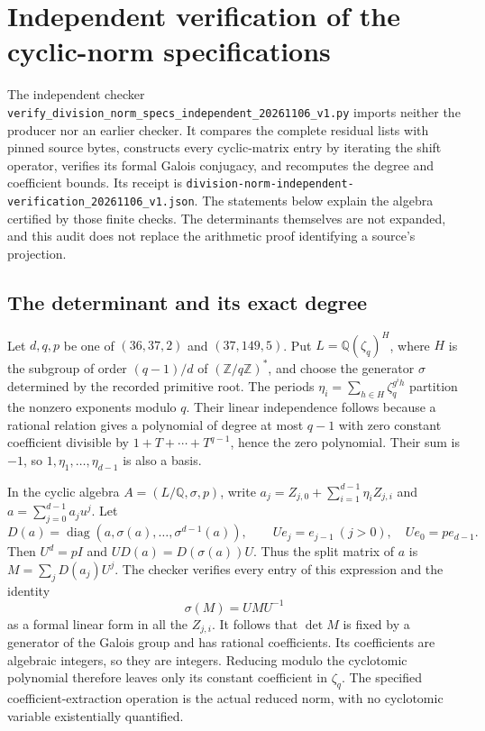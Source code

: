 \section{Independent verification of the cyclic-norm specifications}
\label{sec:independent-norm-audit-phase3}

The independent checker
\texttt{verify\_division\_norm\_specs\_independent\_20261106\_v1.py}
imports neither the producer nor an earlier checker.  It compares the
complete residual lists with pinned source bytes, constructs every
cyclic-matrix entry by iterating the shift operator, verifies its formal
Galois conjugacy, and recomputes the degree and coefficient bounds.
Its receipt is
\texttt{division-norm-independent-verification\_20261106\_v1.json}.
The statements below explain the algebra certified by those finite checks.
The determinants themselves are not expanded, and this audit does not
replace the arithmetic proof identifying a source's projection.

\subsection{The determinant and its exact degree}

Let $d,q,p$ be one of $(36,37,2)$ and $(37,149,5)$.  Put
$L=\mathbb Q(\zeta_q)^H$, where $H$ is the subgroup of order
$(q-1)/d$ of $(\mathbb Z/q\mathbb Z)^*$, and choose the generator
$\sigma$ determined by the recorded primitive root.  The periods
$\eta_i=\sum_{h\in H}\zeta_q^{g^ih}$ partition the nonzero
exponents modulo $q$.  Their linear independence follows because
a rational relation gives a polynomial of degree at most $q-1$
with zero constant coefficient divisible by
$1+T+\cdots+T^{q-1}$, hence the zero polynomial.  Their sum is
$-1$, so $1,\eta_1,\ldots,\eta_{d-1}$ is also a basis.

In the cyclic algebra $A=(L/\mathbb Q,\sigma,p)$, write
$a_j=Z_{j,0}+\sum_{i=1}^{d-1}\eta_iZ_{j,i}$ and
$a=\sum_{j=0}^{d-1}a_ju^j$.  Let
\[
 D(a)=\operatorname{diag}(a,\sigma(a),\ldots,\sigma^{d-1}(a)),
 \qquad Ue_j=e_{j-1}\ (j>0),\quad Ue_0=pe_{d-1}.
\]
Then $U^d=pI$ and $UD(a)=D(\sigma(a))U$.  Thus the split
matrix of $a$ is $M=\sum_jD(a_j)U^j$.
The checker verifies every entry of this expression and the identity
\[
                            \sigma(M)=UMU^{-1}
\]
as a formal linear form in all the $Z_{j,i}$.  It follows that
$\det M$ is fixed by a generator of the Galois group and has
rational coefficients.  Its coefficients are algebraic integers,
so they are integers.  Reducing modulo the cyclotomic polynomial
therefore leaves only its constant coefficient in $\zeta_q$.
The specified coefficient-extraction operation is the actual reduced
norm, with no cyclotomic variable existentially quantified.

